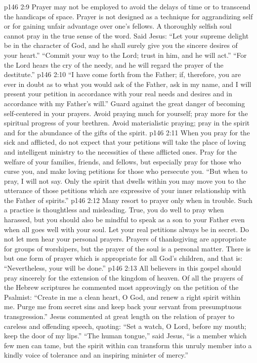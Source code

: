 \pc \vs p146 2:9 \bibnobreakspace Prayer may not be employed to avoid the delays of time or to transcend the handicaps of space. Prayer is not designed as a technique for aggrandizing self or for gaining unfair advantage over one’s fellows. A thoroughly selfish soul cannot pray in the true sense of the word. Said Jesus: \textcolor{ubdarkred}{“Let your supreme delight be in the character of God, and he shall surely give you the sincere desires of your heart.” “Commit your way to the Lord; trust in him, and he will act.” “For the Lord hears the cry of the needy, and he will regard the prayer of the destitute.”}
\pc \vs p146 2:10 \bibnobreakspace \textcolor{ubdarkred}{“I have come forth from the Father; if, therefore, you are ever in doubt as to what you would ask of the Father, ask in my name, and I will present your petition in accordance with your real needs and desires and in accordance with my Father’s will.”} Guard against the great danger of becoming self\hyp{}centered in your prayers. Avoid praying much for yourself; pray more for the spiritual progress of your brethren. Avoid materialistic praying; pray in the spirit and for the abundance of the gifts of the spirit.
\pc \vs p146 2:11 \bibnobreakspace When you pray for the sick and afflicted, do not expect that your petitions will take the place of loving and intelligent ministry to the necessities of these afflicted ones. Pray for the welfare of your families, friends, and fellows, but especially pray for those who curse you, and make loving petitions for those who persecute you. \textcolor{ubdarkred}{“But when to pray, I will not say. Only the spirit that dwells within you may move you to the utterance of those petitions which are expressive of your inner relationship with the Father of spirits.”}
\pc \vs p146 2:12 \bibnobreakspace Many resort to prayer only when in trouble. Such a practice is thoughtless and misleading. True, you do well to pray when harassed, but you should also be mindful to speak as a son to your Father even when all goes well with your soul. Let your real petitions always be in secret. Do not let men hear your personal prayers. Prayers of thanksgiving are appropriate for groups of worshipers, but the prayer of the soul is a personal matter. There is but one form of prayer which is appropriate for all God’s children, and that is: \textcolor{ubdarkred}{“Nevertheless, your will be done.”}
\pc \vs p146 2:13 \bibnobreakspace All believers in this gospel should pray sincerely for the extension of the kingdom of heaven. Of all the prayers of the Hebrew scriptures he commented most approvingly on the petition of the Psalmist: “Create in me a clean heart, O God, and renew a right spirit within me. Purge me from secret sins and keep back your servant from presumptuous transgression.” Jesus commented at great length on the relation of prayer to careless and offending speech, quoting: \textcolor{ubdarkred}{“Set a watch, O Lord, before my mouth; keep the door of my lips.” “The human tongue,”} said Jesus, \textcolor{ubdarkred}{“is a member which few men can tame, but the spirit within can transform this unruly member into a kindly voice of tolerance and an inspiring minister of mercy.”}\plusone

